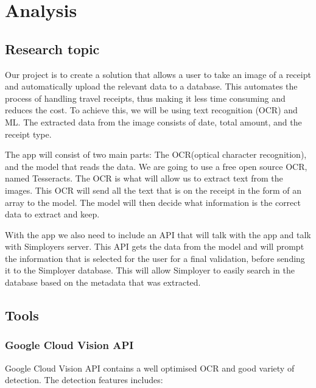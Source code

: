 \cleardoublepage
\chapter{Analysis}
\label{ch:analysis}

\section{Research topic}\label{sec:research-topic}

Our project is to create a solution that allows a user to take an image of a receipt and automatically upload the relevant data to a database.
This automates the process of handling travel receipts, thus making it less time consuming and reduces the cost.
To achieve this, we will be using text recognition (OCR) and ML\@.
The extracted data from the image consists of date, total amount, and the receipt type.

The app will consist of two main parts: The OCR(optical character recognition), and the model that reads the data.
We are going to use a free open source OCR, named Tesseracts.
The OCR is what will allow us to extract text from the images.
This OCR will send all the text that is on the receipt in the form of an array to the model.
The model will then decide what information is the correct data to extract and keep.

With the app we also need to include an API that will talk with the app and talk with Simployers server.
This API gets the data from the model and will prompt the information that is selected for the user for a final
validation, before sending it to the Simployer database.
This will allow Simployer to easily search in the database based on the metadata that was extracted.

\section{Tools}\label{sec:tools}
\subsection{Google Cloud Vision API}\label{subsec:API_Google}

Google Cloud Vision API contains a well optimised OCR and good variety of detection.
The detection features includes:

